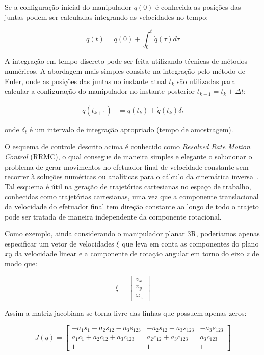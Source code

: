 Se a configuração inicial do manipulador \(q(0)\) é conhecida as posições das
juntas podem ser calculadas integrando as velocidades no tempo:

\begin{equation}
    q(t) = q(0) + \int_{0}^{t} \dot{q}(\tau) d\tau
\end{equation}

A integração em tempo discreto pode ser feita utilizando técnicas de métodos
numéricos. A abordagem mais simples consiste na integração pelo método de
Euler, onde as posições das juntas no instante atual \(t_k\) são utilizadas
para calcular a configuração do manipulador no instante posterior \(t_{k+1} =
t_k + \Delta t\):

\begin{align}
    q(t_{k + 1}) & = q(t_k) + \dot{q}(t_k) \delta_t
\end{align}

onde \(\delta_t\) é um intervalo de integração apropriado (tempo de
amostragem).

O esquema de controle descrito acima é conhecido como \emph{Resolved Rate Motion Control} (RRMC), o qual consegue de 
maneira simples e elegante o solucionar o problema de gerar movimentos no efetuador final de velocidade constante sem recorrer à
soluções numéricas ou analíticas para o cálculo da cinemática inversa~\cite{corke_robotics_2023}. 
Tal esquema é útil na geração de trajetórias cartesianas no espaço de trabalho,
conhecidas como trajetórias cartesianas, uma vez que a componente translacional
da velocidade do efetuador final tem direção constante ao longo de todo o
trajeto pode ser tratada de maneira independente da componente rotacional.

Como exemplo, ainda considerando o manipulador planar 3R, poderíamos apenas
especificar um vetor de velocidades \(\xi\) que leva em conta as componentes do
plano \(xy\) da velocidade linear e a componente de rotação angular em torno do
eixo \(z\) de modo que:

\begin{equation}
    \xi = \begin{bmatrix}
        v_x \\
        v_y \\
        \omega_z
    \end{bmatrix}
\end{equation}

Assim a matriz jacobiana se torna livre das linhas que possuem apenas zeros:

\begin{equation}
    J(q) = \begin{bmatrix}
        -a_1 s_1 - a_2 s_{12} - a_3 s_{123} & -a_2 s_{12} - a_3 s_{123} & -a_3 s_{123} \\
        a_1 c_1 + a_2 c_{12} + a_3 c_{123}  & a_2 c_{12} + a_3 c_{123}  & a_3 c_{123}  \\
        1                                   & 1                         & 1
    \end{bmatrix}
\end{equation}

